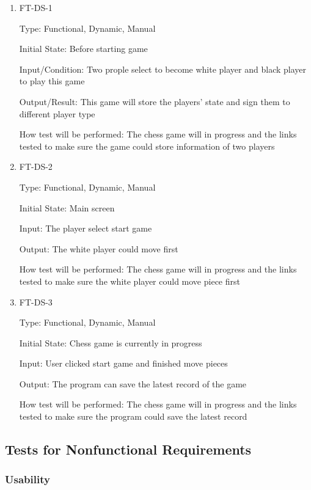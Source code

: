 \documentclass[12pt, titlepage]{article}
\begin{document}
\begin{enumerate}

\item{FT-DS-1\\}

Type: Functional, Dynamic, Manual
					
Initial State: Before starting game
					
Input/Condition: Two prople select to become white player and black player to play this game
					
Output/Result: This game will store the players' state and sign them to different player type
					
How test will be performed: The chess game will in progress and the links tested to make sure the game could store information of two players

\item{FT-DS-2\\}

Type: Functional, Dynamic, Manual
					
Initial State: Main screen
					
Input: The player select start game
					
Output: The white player could move first
					
How test will be performed: The chess game will in progress and the links tested to make sure the white player could move piece first

\item{FT-DS-3\\}

Type: Functional, Dynamic, Manual
					
Initial State:  Chess game is currently in progress
					
Input: User clicked start game and finished move pieces
					
Output: The program can save the latest record of the game
					
How test will be performed: The chess game will in progress and the links tested to make sure the program could save the latest record

\end{enumerate}

\subsection{Tests for Nonfunctional Requirements}

\subsubsection{Usability}
\end{document}
